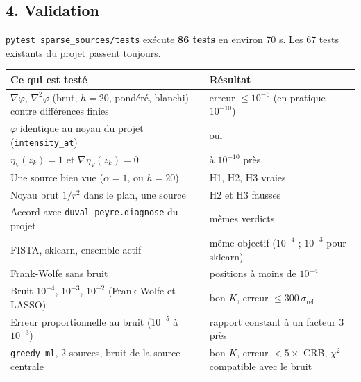 \documentclass[
  french,
]{article}
\newcounter{none} %
\begin{document}
\subsection{4. Validation}\label{validation}

\texttt{pytest\ sparse\_sources/tests} exécute \textbf{86 tests} en
environ 70 s. Les 67 tests existants du projet passent toujours.

{\def\LTcaptype{none} %
\begin{longtable}[]{@{}
  >{\raggedright\arraybackslash}p{}
  >{\raggedright\arraybackslash}p{}@{}}
\toprule\noalign{}
\begin{minipage}[b]{\linewidth}\raggedright
Ce qui est testé
\end{minipage} & \begin{minipage}[b]{\linewidth}\raggedright
Résultat
\end{minipage} \\
\midrule\noalign{}
\endhead
\bottomrule\noalign{}
\endlastfoot
\(\nabla\varphi\), \(\nabla^2\varphi\) (brut, \(h = 20\), pondéré,
blanchi) contre différences finies & erreur \(\le 10^{-6}\) (en pratique
\(10^{-10}\)) \\
\(\varphi\) identique au noyau du projet (\texttt{intensity\_at}) &
oui \\
\(\eta_V(z_k) = 1\) et \(\nabla\eta_V(z_k) = 0\) & à \(10^{-10}\)
près \\
Une source bien vue (\(\alpha = 1\), ou \(h = 20\)) & H1, H2, H3
vraies \\
Noyau brut \(1/r^2\) dans le plan, une source & H2 et H3 fausses \\
Accord avec \texttt{duval\_peyre.diagnose} du projet & mêmes verdicts \\
FISTA, sklearn, ensemble actif & même objectif (\(10^{-4}\) ;
\(10^{-3}\) pour sklearn) \\
Frank-Wolfe sans bruit & positions à moins de \(10^{-4}\) \\
Bruit \(10^{-4}\), \(10^{-3}\), \(10^{-2}\) (Frank-Wolfe et LASSO) & bon
\(K\), erreur \(\le 300\,\sigma_{\mathrm{rel}}\) \\
Erreur proportionnelle au bruit (\(10^{-5}\) à \(10^{-3}\)) & rapport
constant à un facteur 3 près \\
\texttt{greedy\_ml}, 2 sources, bruit de la source centrale & bon \(K\),
erreur \(< 5\times\) CRB, \(\chi^2\) compatible avec le bruit \\

\end{longtable}}
\end{document}
